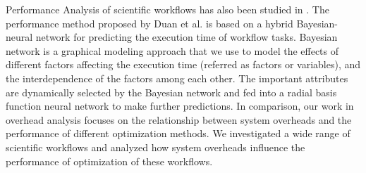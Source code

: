 Performance Analysis of scientific workflows has also been studied in \cite{Rubing2009, Calasanz2008, Truong2004, Uysal1998}. The performance method proposed by Duan et al. \cite{Rubing2009} is based on a hybrid Bayesian-neural network for predicting the execution time of workflow tasks. Bayesian network is a graphical modeling approach that we use to model the effects of different factors affecting the execution time (referred as factors or variables), and the interdependence of the factors among each other. The important attributes are dynamically selected by the Bayesian network and fed into a radial basis function neural network to make further predictions. In comparison, our work in overhead analysis focuses on the relationship between system overheads and the performance of different optimization methods. We investigated a wide range of scientific workflows and analyzed how system overheads influence the performance of optimization of these workflows. 




